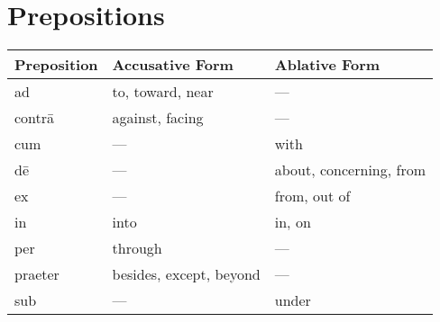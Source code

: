 \section{Prepositions}

\setlength\columnseprule{.4pt}
\renewcommand{\arraystretch}{2.5}

\vspace{3em}
\begin{tabu} to \linewidth{X[l]X[l]X[l]}\toprule
  Preposition & Accusative Form & Ablative Form \\\midrule
  ad        & to, toward, near        & --- \\
  contr\=a  & against, facing         & --- \\
  cum       & ---                     & with \\
  d\=e      & ---                     & about, concerning, from \\
  ex        & ---                     & from, out of \\
  in        & into                    & in, on \\
  per       & through                 & --- \\
  praeter   & besides, except, beyond & --- \\
  sub       & ---                     & under \\
\end{tabu}
